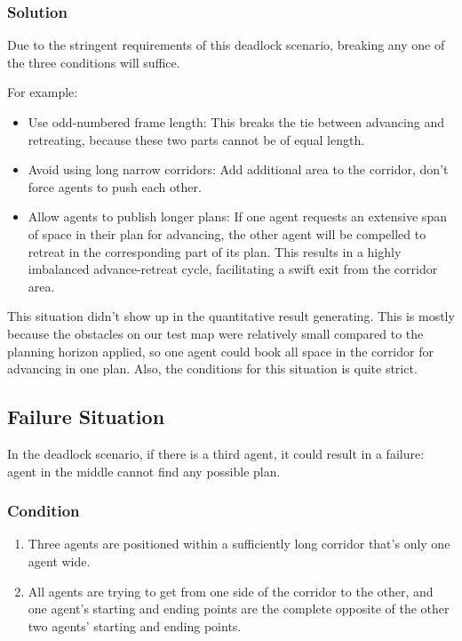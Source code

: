 \subsubsection{Solution}

Due to the stringent requirements of this deadlock scenario, breaking any one of the three conditions will suffice.

For example:
\begin{itemize}
    \item Use odd-numbered frame length: This breaks the tie between advancing and retreating, because these two parts cannot be of equal length.
    \item Avoid using long narrow corridors: Add additional area to the corridor, don't force agents to push each other.
    \item Allow agents to publish longer plans:
     If one agent requests an extensive span of space in their plan for advancing, the other agent will be compelled to retreat in the corresponding part of its plan. This results in a highly imbalanced advance-retreat cycle, facilitating a swift exit from the corridor area.
\end{itemize}

This situation didn't show up in the quantitative result generating. This is mostly because the obstacles on our test map were relatively small compared to the planning horizon applied, so one agent could book all space in the corridor for advancing in one plan. Also, the conditions for this situation is quite strict.

\subsection{Failure Situation}

In the deadlock scenario, if there is a third agent, it could result in a failure: agent in the middle cannot find any possible plan.

\subsubsection{Condition}

\begin{enumerate}
    \item Three agents are positioned within a sufficiently long corridor that's only one agent wide.
    \item All agents are trying to get from one side of the corridor to the other, and one agent's starting and ending points are the complete opposite of the other two agents' starting and ending points.
\end{enumerate}

